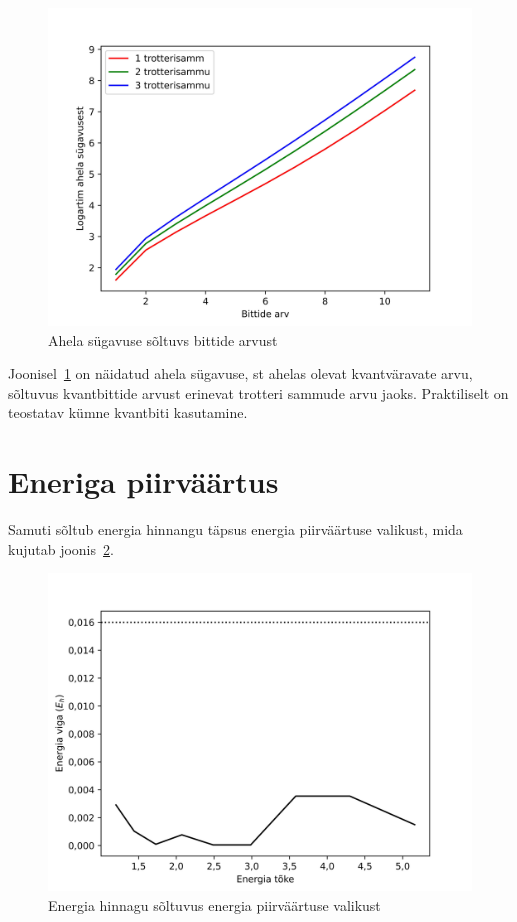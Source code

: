 \documentclass[12pt]{report}
\begin{document}
\begin{figure}[h]
    \centering
    \includegraphics{depths.jpg}
    \caption{Ahela sügavuse sõltuvs bittide arvust}
    \label{fig:depths}
\end{figure}

Joonisel~\ref{fig:depths} on näidatud ahela sügavuse, st ahelas olevat kvantväravate arvu, sõltuvus kvantbittide arvust erinevat trotteri sammude arvu jaoks.
Praktiliselt on teostatav kümne kvantbiti kasutamine.


\section{Eneriga piirväärtus}

Samuti sõltub energia hinnangu täpsus energia piirväärtuse valikust, mida kujutab joonis~\ref{fig:bounds}.

\begin{figure}[h]
    \centering
    \includegraphics{bounds.jpg}
    \caption{Energia hinnagu sõltuvus energia piirväärtuse valikust}
    \label{fig:bounds}
\end{figure}
\end{document}
